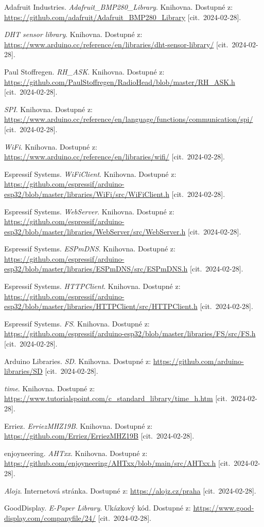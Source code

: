 \documentclass[twoside]{ctuthesis}
\theoremstyle{plain}
\theoremstyle{definition}
\theoremstyle{note}
\begin{document}
\begin{thebibliography}{99}
 Adafruit Industries. {\it \hbox{Adafruit\_BMP280\_Library}}. Knihovna. Dostupné z: \url{https://github.com/adafruit/Adafruit_BMP280_Library} [cit.~2024-02-28].

 {\it DHT sensor library}. Knihovna. Dostupné z: \url{https://www.arduino.cc/reference/en/libraries/dht-sensor-library/} [cit.~2024-02-28].

 Paul Stoffregen. {\it \hbox{RH\_ASK}}. Knihovna. Dostupné z: \url{https://github.com/PaulStoffregen/RadioHead/blob/master/RH_ASK.h} [cit.~2024-02-28].

 {\it SPI}. Knihovna. Dostupné z: \url{https://www.arduino.cc/reference/en/language/functions/communication/spi/} [cit.~2024-02-28].

 {\it WiFi}. Knihovna. Dostupné z: \url{https://www.arduino.cc/reference/en/libraries/wifi/} [cit.~2024-02-28].

 Espressif Systems. {\it WiFiClient}. Knihovna. Dostupné z: \url{https://github.com/espressif/arduino-esp32/blob/master/libraries/WiFi/src/WiFiClient.h} [cit.~2024-02-28].

 Espressif Systems. {\it WebServer}. Knihovna. Dostupné z: \url{https://github.com/espressif/arduino-esp32/blob/master/libraries/WebServer/src/WebServer.h} [cit.~2024-02-28].

 Espressif Systems. {\it ESPmDNS}. Knihovna. Dostupné z: \url{https://github.com/espressif/arduino-esp32/blob/master/libraries/ESPmDNS/src/ESPmDNS.h} [cit.~2024-02-28].

 Espressif Systems. {\it HTTPClient}. Knihovna. Dostupné z: \url{https://github.com/espressif/arduino-esp32/blob/master/libraries/HTTPClient/src/HTTPClient.h} [cit.~2024-02-28].

 Espressif Systems. {\it FS}. Knihovna. Dostupné z: \url{https://github.com/espressif/arduino-esp32/blob/master/libraries/FS/src/FS.h} [cit.~2024-02-28].

 Arduino Libraries. {\it SD}. Knihovna. Dostupné z: \url{https://github.com/arduino-libraries/SD} [cit.~2024-02-28].

 {\it time}. Knihovna. Dostupné z: \url{https://www.tutorialspoint.com/c_standard_library/time_h.htm} [cit.~2024-02-28].

 Erriez. {\it ErriezMHZ19B}. Knihovna. Dostupné z: \url{https://github.com/Erriez/ErriezMHZ19B} [cit.~2024-02-28].

 enjoyneering. {\it AHTxx}. Knihovna. Dostupné z: \url{https://github.com/enjoyneering/AHTxx/blob/main/src/AHTxx.h} [cit.~2024-02-28].

 {\it Alojz}. Internetová stránka. Dostupné z: \url{https://alojz.cz/praha} [cit.~2024-02-28].

 GoodDisplay. {\it E-Paper Library}. Ukázkový kód. Dostupné z: \url{https://www.good-display.com/companyfile/24/} [cit.~2024-02-28].

\end{thebibliography}
\appendix

\end{document}
